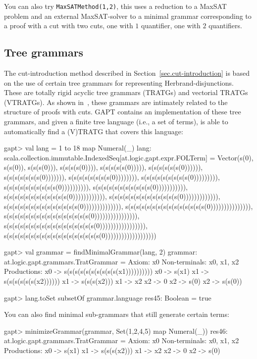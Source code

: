 \documentclass[a4paper,11pt]{article}
\begin{document}
You can also try \texttt{MaxSATMethod(1,2)}, this uses a reduction to a MaxSAT
problem and an external MaxSAT-solver to a
minimal grammar corresponding to a proof with a cut with two cuts, one with $1$
quantifier, one with $2$ quantifiers.

\subsection{Tree grammars}

The cut-introduction method described in Section~\ref{sec.cut-introduction} is
based on the use of certain tree grammars for representing Herbrand-disjunctions.
These are totally rigid acyclic tree grammars (TRATGs) and vectorial TRATGs (VTRATGs).
As shown in~\cite{Hetzl14Algorithmic}, these grammars are intimately related to
the structure of proofs with cuts.  GAPT contains an implementation of
these tree grammars, and given a finite tree language (i.e., a set of terms), is
able to automatically find a (V)TRATG that covers this language:

\begin{clilisting}
gapt> val lang = 1 to 18 map { Numeral(_) }
lang: scala.collection.immutable.IndexedSeq[at.logic.gapt.expr.FOLTerm] = Vector(s(0), s(s(0)), s(s(s(0))), s(s(s(s(0)))), s(s(s(s(s(0))))), s(s(s(s(s(s(0)))))), s(s(s(s(s(s(s(0))))))), s(s(s(s(s(s(s(s(0)))))))), s(s(s(s(s(s(s(s(s(0))))))))), s(s(s(s(s(s(s(s(s(s(0)))))))))), s(s(s(s(s(s(s(s(s(s(s(0))))))))))), s(s(s(s(s(s(s(s(s(s(s(s(0)))))))))))), s(s(s(s(s(s(s(s(s(s(s(s(s(0))))))))))))), s(s(s(s(s(s(s(s(s(s(s(s(s(s(0)))))))))))))), s(s(s(s(s(s(s(s(s(s(s(s(s(s(s(0))))))))))))))), s(s(s(s(s(s(s(s(s(s(s(s(s(s(s(s(0)))))))))))))))), s(s(s(s(s(s(s(s(s(s(s(s(s(s(s(s(s(0))))))))))))))))), s(s(s(s(s(s(s(s(s(s(s(s(s(s(s(s(s(s(0)))))))))))))))))))

gapt> val grammar = findMinimalGrammar(lang, 2)
grammar: at.logic.gapt.grammars.TratGrammar =
Axiom: x0
Non-terminals: x0, x1, x2
Productions:
  x0 -> s(s(s(s(s(s(s(s(s(s(x1))))))))))
  x0 -> s(x1)
  x1 -> s(s(s(s(s(s(x2))))))
  x1 -> s(s(s(x2)))
  x1 -> x2
  x2 -> 0
  x2 -> s(0)
  x2 -> s(s(0))

gapt> lang.toSet subsetOf grammar.language
res45: Boolean = true

\end{clilisting}

You can also find minimal sub-grammars that still generate certain terms:
\begin{clilisting}
gapt> minimizeGrammar(grammar, Set(1,2,4,5) map {Numeral(_)})
res46: at.logic.gapt.grammars.TratGrammar =
Axiom: x0
Non-terminals: x0, x1, x2
Productions:
  x0 -> s(x1)
  x1 -> s(s(s(x2)))
  x1 -> x2
  x2 -> 0
  x2 -> s(0)

\end{clilisting}
\end{document}
